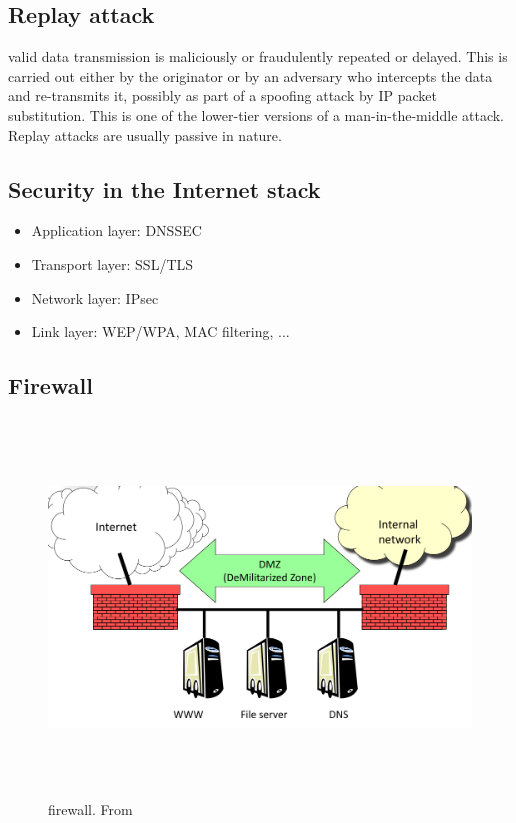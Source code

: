\begin{multicols}{2}
\subsection{Replay attack}
valid data transmission is maliciously or fraudulently repeated or delayed. This is carried out either by the originator or by an adversary who intercepts the data and re-transmits it, possibly as part of a spoofing attack by IP packet substitution. This is one of the lower-tier versions of a man-in-the-middle attack. Replay attacks are usually passive in nature.

\subsection{Security in the Internet stack}
\begin{itemize}
\item Application layer: DNSSEC
\item Transport layer: SSL/TLS
\item Network layer: IPsec
\item Link layer: WEP/WPA, MAC filtering, ...
\end{itemize}

\subsection{Firewall}
\begin{figure}[h]
    \vspace{10mm}
    \centering
    \includegraphics[width=16cm, height=10cm]{image/firewall.png}
    \caption{firewall. From \cite{}}
\end{figure}

\end{multicols}